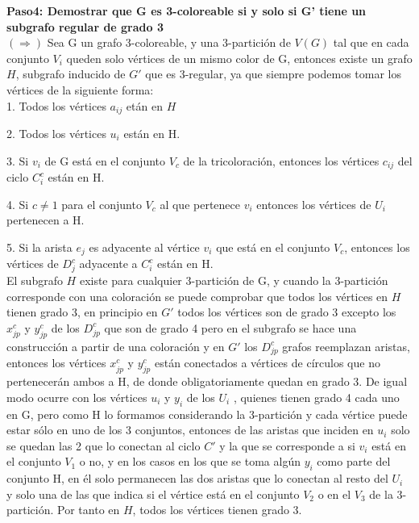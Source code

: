 \documentclass[
10pt, %
a4paper, %
oneside, %
headinclude,footinclude, %
BCOR5mm, %
]{scrartcl}
\begin{document}
\textbf{Paso4: Demostrar que G es 3-coloreable si y solo si G' tiene un subgrafo regular de grado 3  }\\

$(\Rightarrow)$ Sea G un grafo 3-coloreable, y una 3-partición de $V(G)$ tal que en cada conjunto $V_i$ queden solo vértices de un mismo color de G, entonces existe un grafo $H$, 
subgrafo inducido de $G'$ que es 3-regular, ya que siempre podemos tomar los vértices de la siguiente forma:\\

1. Todos los vértices $a_{ij}$ etán en $H$

2. Todos los vértices $u_i$ est\'an en H.

3. Si $v_i$ de G est\'a en el conjunto $V_c$ de la tricoloraci\'on, entonces los v\'ertices $c_{ij}$ del ciclo $C^c_i$ est\'an en H.

4. Si $ c \neq 1$ para el conjunto $V_c$ al que pertenece $v_i$ entonces los vértices de $U_i$ pertenecen a H.

5. Si la arista $e_j$ es adyacente al v\'ertice $v_i$ que est\'a en el conjunto $V_c$, entonces los v\'ertices de $D^c_j$ adyacente a $C^c_i$ est\'an en H. \\


El subgrafo $H$ existe para cualquier 3-partición de G, y cuando la 3-partición corresponde con una coloración se puede comprobar que todos los vértices en
$H$ tienen grado 3, en principio en $G'$ todos los vértices son de grado 3 excepto los $x_{jp}^{c}$ y $y_{jp}^{c}$ de los $D_{jp}^{c}$ que son de grado 4 pero en el subgrafo se hace 
una construcción a partir de una coloración y en $G'$ los $D_{jp}^{c}$ grafos reemplazan aristas, entonces los vértices $x_{jp}^{c}$ y $y_{jp}^{c}$ están conectados a vértices de círculos que
no pertenecerán ambos a H, de donde obligatoriamente quedan en grado 3. De
igual modo ocurre con los vértices $u_i$ y $y_i$ de los $U_i$ , quienes tienen grado 4 cada uno en G, pero como H lo formamos considerando la 3-partición y cada vértice
puede estar sólo en uno de los 3 conjuntos, entonces de las aristas que inciden
en $u_i$ solo se quedan las 2 que lo conectan al ciclo $C'$ y la que se corresponde a
si $v_i$ está en el conjunto $V_1$ o no, y en los casos en los que se toma algún $y_i$ como
parte del conjunto H, en él solo permanecen las dos aristas que lo conectan
al resto del $U_i$ y solo una de las que indica si el vértice está en el conjunto $V_2$
o en el $V_3$ de la 3-partición. Por tanto en $H$, todos los vértices tienen grado 3. \\
\end{document}
